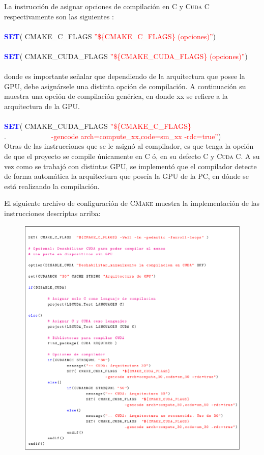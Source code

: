 La instrucción de asignar opciones de compilación en \textsc{C} y \textsc{Cuda C} respectivamente son las siguientes :
\\\\
\textcolor{blue}{\textbf{SET}}( CMAKE\_C\_FLAGS  \textcolor{red}{''\$\{CMAKE\_C\_FLAGS\} (opciones)''})
\\\\
\textcolor{blue}{\textbf{SET}}( CMAKE\_CUDA\_FLAGS  \textcolor{red}{''\$\{CMAKE\_CUDA\_FLAGS\} (opciones)''})
\\
\\
donde es importante señalar que dependiendo de la arquitectura que posee la GPU, debe asignársele una distinta opción de compilación. A continuación su muestra una opción de compilación genérica, en donde xx se refiere a la arquitectura de la GPU.
\\
\\
\textcolor{blue}{\textbf{SET}}( CMAKE\_CUDA\_FLAGS \textcolor{red}{''\$\{CMAKE\_C\_FLAGS\}}\\
                 $.\qquad \qquad \qquad $\textcolor{red}{ -gencode arch=compute\_xx,code=sm\_xx -rdc=true''})
\\

Otras de las instrucciones que se le asignó al compilador, es que tenga la opción de que el proyecto se  compile únicamente en \textsc{C} ó, en su defecto  \textsc{C} y \textsc{Cuda C}. A su vez como se trabajó con distintas GPU, se implementó que el compilador detecte de forma automática la arquitectura que poseía la GPU de la PC, en dónde se está realizando la compilación. 

El siguiente archivo de configuración de \textsc{CMake} muestra la implementación de las instrucciones descriptas arriba:
\newpage

\begin{figure}[H]
	\centering
	\includegraphics[width=\textwidth]{figs/cap3/cmake_1.png}
\end{figure}

